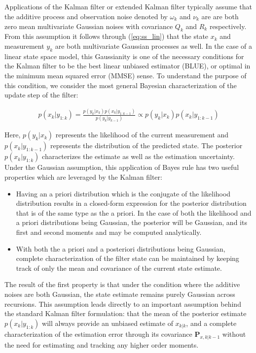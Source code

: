 \subsection{} \label{sec:A4}

Applications of the Kalman filter or extended Kalman filter typically assume that the additive process and observation noise denoted by $\omega_{k}$ and $\nu_{k}$ are are both zero mean multivariate Gaussian noises with covariance $Q_{k}$ and $R_{k}$ respectively. From this assumption it follows through (\ref{eq:ss_lin}) that the state $x_{k}$ and measurement $y_{k}$ are both multivariate Gaussian processes as well. In the case of a linear state space model, this Gaussianity is one of the necessary conditions for the Kalman filter to be the best linear unbiased estimator (BLUE), or optimal in the minimum mean squared error (MMSE) sense. To understand the purpose of this condition, we consider the most general Bayesian characterization of the update step of the filter:

\begin{align}
    p(x_{k}|y_{1:k}) = \frac{p(y_{k}|x_{k})p(x_{k}|y_{1:k-1})}{p(y_{k}|y_{k-1})} \propto p(y_{k}|x_{k})p(x_{k}|y_{1:k-1})
\end{align}

\noindent Here, $p(y_{k}|x_{k})$ represents the likelihood of the current measurement and $p(x_{k}|y_{1:k-1})$ represents the distribution of the predicted state. The posterior $p(x_{k}|y_{1:k})$ characterizes the estimate as well as the estimation uncertainty. Under the Gaussian assumption, this application of Bayes rule has two useful properties which are leveraged by the Kalman filter:
\begin{itemize}
    \item Having an a priori distribution which is the conjugate of the likelihood distribution results in a closed-form expression for the posterior distribution that is of the same type as the a priori. In the case of both the likelihood and a priori distributions being Gaussian, the posterior will be Gaussian, and its first and second moments and may be computed analytically.
    \item With both the a priori and a posteriori distributions being Gaussian, complete characterization of the filter state can be maintained by keeping track of only the mean and covariance of the current state estimate.
\end{itemize}
The result of the first property is that under the condition where the additive noises are both Gaussian, the state estimate remains purely Gaussian across recursions. This assumption leads directly to an important assumption behind the standard Kalman filter formulation: that the mean of the posterior estimate $p(x_{k}|y_{1:k})$ will always provide an unbiased estimate of $x_{k|k}$, and a complete characterization of the estimation error through its covariance $\mathbf{P}_{x,k|k-1}$ without the need for estimating and tracking any higher order moments. 

